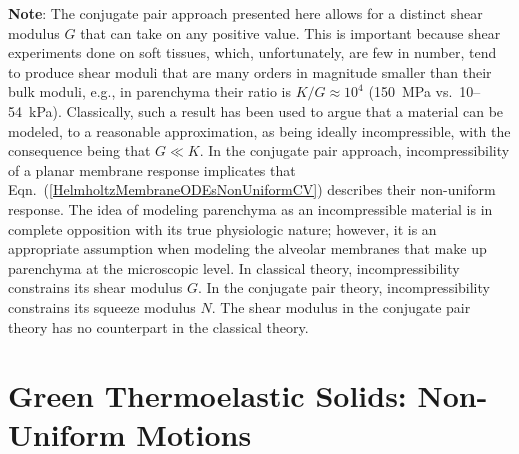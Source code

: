 \medskip\noindent
\textbf{Note}: 
The conjugate pair approach presented here allows for a distinct shear modulus $G$ that can take on any positive value.  This is important because shear experiments done on soft tissues, which, unfortunately, are few in number, tend to produce shear moduli that are many orders in magnitude smaller than their bulk moduli, e.g., in parenchyma their ratio is $K/G \approx 10^{4}$ (150~MPa vs.\ 10--54~kPa).  \cite{Sarafetal07}  Classically, such a result has been used to argue that a material can be modeled, to a reasonable approximation, as being ideally incompressible, with the consequence being that $G \ll K$.  In the conjugate pair approach, incompressibility of a planar membrane response implicates that Eqn.~(\ref{HelmholtzMembraneODEsNonUniformCV}) describes their non-uniform response.  The idea of modeling parenchyma as an incompressible material is in complete opposition with its true physiologic nature; however, it is an appropriate assumption when modeling the alveolar membranes that make up parenchyma at the micro\-scopic level.  In classical theory, incompressibility constrains its shear modulus $G$.  In the conjugate pair theory, incompressibility constrains its squeeze modulus $N$. \cite{Freedetal17,Freed17,FreedZamani19,Freedetal19,ClaytonFreed19,ClaytonFreed20,Freedetal20}  The shear modulus in the conjugate pair theory has no counterpart in the classical theory.

\section{Green Thermoelastic Solids: Non-Uniform Motions}
\label{secNonuniform3D}


